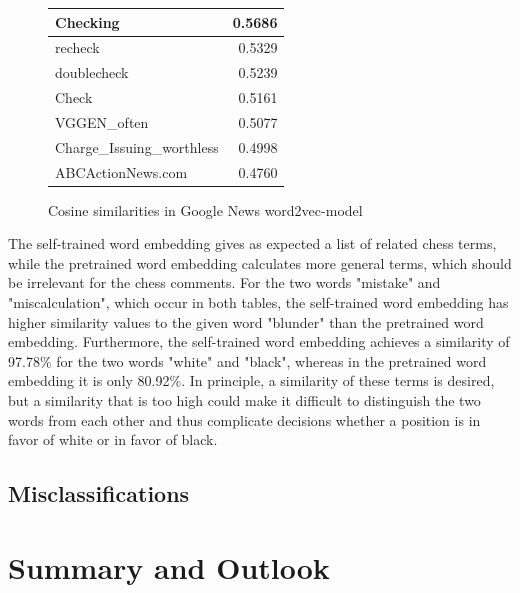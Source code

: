 \documentclass[article,type=msc,colorback,accentcolor=tud7b]{tudthesis}
\begin{document}
\begin{figure}[H]
\begin{floatrow}
{{\begin{tabular}{| l | r |}
		Checking & 0.5686 \\ \hline
		recheck & 0.5329 \\ \hline
		doublecheck & 0.5239 \\ \hline
		Check & 0.5161 \\ \hline
		VGGEN\_often & 0.5077 \\ \hline
		Charge\_Issuing\_worthless & 0.4998 \\ \hline
		ABCActionNews.com & 0.4760 \\ \hline
      \end{tabular}
      }
      \quad
      }{%
        \caption{Cosine similarities in Google News word2vec-model}
        \label{tab:cosine_similarities_w2v_pretrained}
      }
      \end{floatrow}
	\end{figure}

    The self-trained word embedding gives as expected a list of related chess terms, while the pretrained word embedding calculates more general terms, which should be irrelevant for the chess comments. For the two words "mistake" and "miscalculation", which occur in both tables, the self-trained word embedding has higher similarity values to the given word "blunder" than the pretrained word embedding. Furthermore, the self-trained word embedding achieves a similarity of 97.78\% for the two words "white" and "black", whereas in the pretrained word embedding it is only 80.92\%. In principle, a similarity of these terms is desired, but a similarity that is too high could make it difficult to distinguish the two words from each other and thus complicate decisions whether a position is in favor of white or in favor of black.
    
  \subsection{Misclassifications}
    
  \clearpage  
  
  \section{Summary and Outlook}

  \clearpage
  
  \printbibliography
  \clearpage
  
\end{document}
